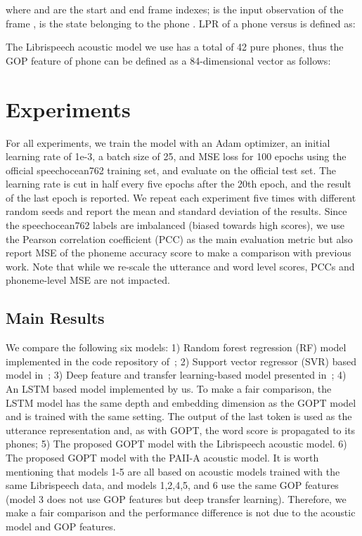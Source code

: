 \documentclass{article}
\newcommand{\squeezeup}{\vspace{-1.6mm}}
\begin{document}
where  and  are the start and end frame indexes;  is the input observation of the frame ,  is the state belonging to the phone . LPR of a phone  versus  is defined as:

The Librispeech acoustic model we use has a total of 42 pure phones, thus the GOP feature of phone  can be defined as a 84-dimensional vector as follows:


\squeezeup\squeezeup
\section{Experiments}
\squeezeup

For all experiments, we train the model with an Adam optimizer, an initial learning rate of 1e-3, a batch size of 25, and MSE loss for 100 epochs using the official speechocean762 training set, and evaluate on the official test set. The learning rate is cut in half every five epochs after the 20th epoch, and the result of the last epoch is reported. We repeat each experiment five times with different random seeds and report the mean and standard deviation of the results. Since the speechocean762 labels are imbalanced (biased towards high scores), we use the Pearson correlation coefficient (PCC) as the main evaluation metric but also report MSE of the phoneme accuracy score to make a comparison with previous work. Note that while we re-scale the utterance and word level scores, PCCs and phoneme-level MSE are not impacted. 

\subsection{Main Results}

We compare the following six models: 1) Random forest regression (RF) model implemented in the code repository of~\cite{zhang2021speechocean762}; 2) Support vector regressor (SVR) based model in~\cite{zhang2021speechocean762}; 3) Deep feature and transfer learning-based model presented in~\cite{lin2021deep}; 4) An LSTM based model implemented by us. To make a fair comparison, the LSTM model has the same depth and embedding dimension as the GOPT model and is trained with the same setting. The output of the last token is used as the utterance representation and, as with GOPT, the word score is propagated to its phones; 5) The proposed GOPT model with the Librispeech acoustic model. 6) The proposed GOPT model with the PAII-A acoustic model. It is worth mentioning that models 1-5 are all based on acoustic models trained with the same Librispeech data, and models 1,2,4,5, and 6 use the same GOP features (model 3 does not use GOP features but deep transfer learning). Therefore, we make a fair comparison and the performance difference is not due to the acoustic model and GOP features.
\end{document}
